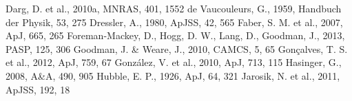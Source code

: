 \documentclass{mn2e}
\begin{document}
\begin{thebibliography}{}
 Darg, D. et al., 2010a, MNRAS, 401, 1552
 de Vaucouleurs, G., 1959, Handbuch der Physik, 53, 275
 Dressler, A., 1980, ApJSS, 42, 565
 Faber, S. M. et al., 2007, ApJ, 665, 265
 Foreman-Mackey, D., Hogg, D. W., Lang, D., Goodman, J., 2013, PASP, 125, 306
 Goodman, J. \& Weare, J., 2010, CAMCS, 5, 65
 Gon\c calves, T. S. et al., 2012, ApJ, 759, 67
 Gonz\'alez, V. et al., 2010, ApJ, 713, 115
 Hasinger, G., 2008, A\&A, 490, 905
 Hubble, E. P., 1926, ApJ, 64, 321
 Jarosik, N. et al., 2011, ApJSS, 192, 18

\end{thebibliography}
\end{document}
